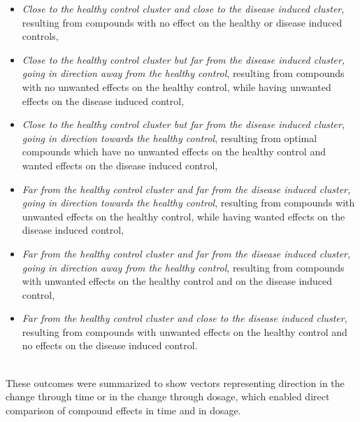 \documentclass[a4paper,12pt]{article}
\begin{document}
\begin{itemize}
  \item \textit{Close to the healthy control cluster and close to the disease induced cluster}, resulting from compounds with no effect on the healthy or disease induced controls,
  \item \textit{Close to the healthy control cluster but far from the disease induced cluster, going in direction away from the healthy control}, resulting from compounds with no unwanted effects on the healthy control, while having unwanted effects on the disease induced control,
  \item \textit{Close to the healthy control cluster but far from the disease induced cluster, going in direction towards the healthy control}, resulting from optimal compounds which have no unwanted effects on the healthy control and wanted effects on the disease induced control,
  \item \textit{Far from the healthy control cluster and far from the disease induced cluster, going in direction towards the healthy control}, resulting from compounds with unwanted effects on the healthy control, while having wanted effects on the disease induced control,  
  \item \textit{Far from the healthy control cluster and far from the disease induced cluster, going in direction away from the healthy control}, resulting from compounds with unwanted effects on the healthy control and on the disease induced control,    
  \item \textit{Far from the healthy control cluster and close to the disease induced cluster}, resulting from compounds with unwanted effects on the healthy control and no effects on the disease induced control.
\end{itemize}
\\
These outcomes were summarized to show vectors representing direction in the change through time or in the change through dosage, which enabled direct comparison of compound effects in time and in dosage.
\end{document}
